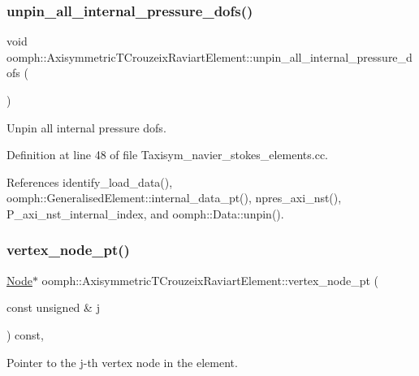 \subsubsection{\texorpdfstring{unpin\+\_\+all\+\_\+internal\+\_\+pressure\+\_\+dofs()}{unpin\_all\_internal\_pressure\_dofs()}}
{\footnotesize\ttfamily void oomph\+::\+Axisymmetric\+T\+Crouzeix\+Raviart\+Element\+::unpin\+\_\+all\+\_\+internal\+\_\+pressure\+\_\+dofs (\begin{DoxyParamCaption}{ }\end{DoxyParamCaption})}



Unpin all internal pressure dofs. 



Definition at line 48 of file Taxisym\+\_\+navier\+\_\+stokes\+\_\+elements.\+cc.



References identify\+\_\+load\+\_\+data(), oomph\+::\+Generalised\+Element\+::internal\+\_\+data\+\_\+pt(), npres\+\_\+axi\+\_\+nst(), P\+\_\+axi\+\_\+nst\+\_\+internal\+\_\+index, and oomph\+::\+Data\+::unpin().

\mbox{\label{classoomph_1_1AxisymmetricTCrouzeixRaviartElement_adbace360a6641c1a5e4eda618c07a9ea}} 
\subsubsection{\texorpdfstring{vertex\+\_\+node\+\_\+pt()}{vertex\_node\_pt()}}
{\footnotesize\ttfamily \hyperlink{classoomph_1_1Node}{Node}$\ast$ oomph\+::\+Axisymmetric\+T\+Crouzeix\+Raviart\+Element\+::vertex\+\_\+node\+\_\+pt (\begin{DoxyParamCaption}\item[{const unsigned \&}]{j }\end{DoxyParamCaption}) const\hspace{0.3cm}{\ttfamily [inline]}, {\ttfamily [virtual]}}



Pointer to the j-\/th vertex node in the element. 



